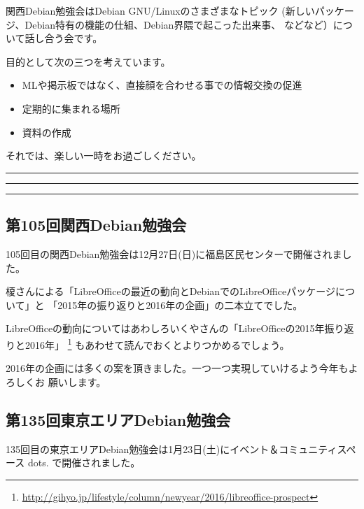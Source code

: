 \documentclass[mingoth,a4paper]{jsarticle}
\begin{document}
 関西Debian勉強会はDebian GNU/Linuxのさまざまなトピック
 (新しいパッケージ、Debian特有の機能の仕組、Debian界隈で起こった出来事、
 などなど）について話し合う会です。

 目的として次の三つを考えています。
 \begin{itemize}
  \item MLや掲示板ではなく、直接顔を合わせる事での情報交換の促進
  \item 定期的に集まれる場所
  \item 資料の作成
 \end{itemize}

 それでは、楽しい一時をお過ごしください。

\newpage

\begin{minipage}[b]{0.2\hsize}
 {}
\end{minipage}
\begin{minipage}[b]{0.8\hsize}
\hrule
\vspace{2mm}
\hrule
\setcounter{tocdepth}{1}
\tableofcontents
\vspace{2mm}
\hrule
\end{minipage}


\subsection{第105回関西Debian勉強会}

105回目の関西Debian勉強会は12月27日(日)に福島区民センターで開催されました。

榎さんによる「LibreOfficeの最近の動向とDebianでのLibreOfficeパッケージについて」と
「2015年の振り返りと2016年の企画」の二本立てでした。

LibreOfficeの動向についてはあわしろいくやさんの「LibreOfficeの2015年振り返りと2016年」
\footnote{\url{http://gihyo.jp/lifestyle/column/newyear/2016/libreoffice-prospect}}
もあわせて読んでおくとよりつかめるでしょう。

2016年の企画には多くの案を頂きました。一つ一つ実現していけるよう今年もよろしくお
願いします。

\subsection{第135回東京エリアDebian勉強会}

135回目の東京エリアDebian勉強会は1月23日(土)にイベント＆コミュニティスペース dots.
で開催されました。
\end{document}
